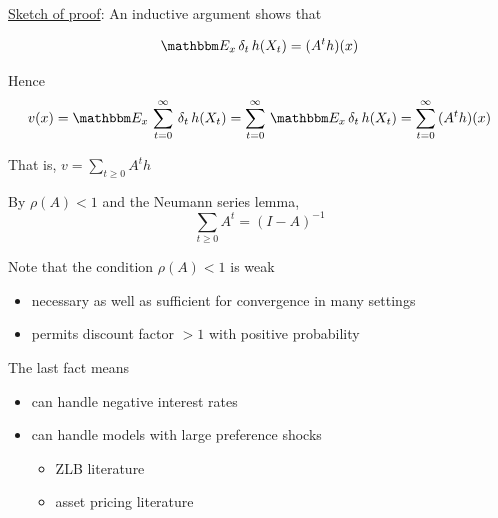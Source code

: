 \documentclass[xcolor=tex,dvipsnames]{beamer}
\begin{document}
\begin{frame}
    

    \underline{Sketch of proof}:  An inductive argument shows that

    \begin{equation*}
        \EE_x \, \delta_t \, h(X_t) = (A^t h)(x)
    \end{equation*}

    Hence
    \begin{equation*}
        v(x) 
            = \EE_x \,
                \sum_{t=0}^\infty \, \delta_t \, h(X_t)
            = \sum_{t=0}^\infty \, \EE_x \, \delta_t \, h(X_t)
            = \sum_{t=0}^\infty \, (A^t h)(x)
    \end{equation*}

    That is, $v = \sum_{t \geq 0} A^t h$

        \vspace{0.4em}
        \vspace{0.4em}
        \vspace{0.4em}

    By $\rho(A) < 1$ and the Neumann series lemma,
    \begin{equation*}
        \sum_{t \geq 0} A^t = (I - A)^{-1}
    \end{equation*}


\end{frame}

\begin{frame}
    
    Note that the condition $\rho(A) < 1$ is weak

    \begin{itemize}
        \item necessary as well as sufficient for convergence in many settings
        \vspace{0.5em}
        \item permits discount factor $>1$ with positive probability
    \end{itemize}

        \vspace{0.5em}
        \vspace{0.5em}
    The last fact means
    \begin{itemize}
        \item can handle negative interest rates
        \vspace{0.5em}
        \item can handle models with large preference shocks
        \begin{itemize}
            \vspace{0.5em}
            \item ZLB literature
            \vspace{0.5em}
            \item asset pricing literature
        \end{itemize}
    \end{itemize}

\end{frame}
\end{document}
